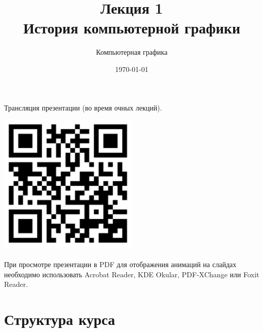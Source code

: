 \documentclass[10pt]{beamer}
\date{\today}
\title{Лекция 1 \\История компьютерной графики}
\subtitle{Компьютерная графика}
\begin{document}
	 
		 	
	
	\begin{frame}[plain]
		
		
		\centering
		Трансляция презентации (во время очных лекций).     
		
		\includegraphics[width=0.5\textwidth, keepaspectratio]{qr.png} \\ ~ \\
		
		
		При просмотре презентации в PDF для отображения анимаций на слайдах необходимо использовать Acrobat Reader, KDE Okular, PDF-XChange или Foxit Reader.
		
	\end{frame}
	
	
	\frame{\maketitle}
	
	\begin{frame}
		\tableofcontents
	\end{frame}
	
	\section{Структура курса}
\end{document}
